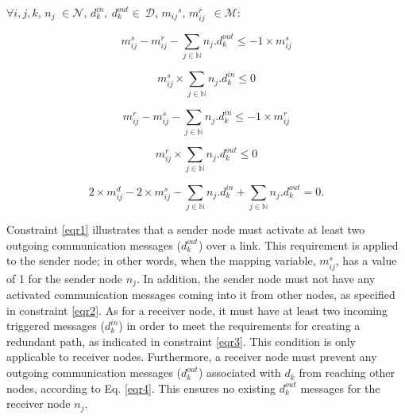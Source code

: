   
    
    
    $\forall i, j, k$, ${n_{j}}$  $\in \mathcal{N}$, $d_k^{in},~d_k^{out}\in~\mathcal{D}$, ${m_{ij}}^{s}$, $m_{ij}^{r}$~$\in\mathcal{M} $:\newline

	\begin{equation}
		 {m_{ij}^{s}} - m_{ij}^{r} -  \sum_{j \in \mathbb{N} } n_{j}.d_{k}^{out} \leq -1 \times {m_{ij}^{s}}
		\label{eqr1} 
	\end{equation}
	
	\begin{equation}%
		 {m_{ij}^{s}} \times \sum_{j \in \mathbb{N} } n_{j}.d_{k}^{in} \leq 0 
		\label{eqr2}
	\end{equation}
	
	\begin{equation}%
		{m_{ij}^{r}}  - m_{ij}^{s}  - \sum_{j \in \mathbb{N} } n_{j}.d_{k}^{in} \leq -1 \times {m_{ij}^{r}}
		\label{eqr3}
	\end{equation}

	\begin{equation}%
		 {m_{ij}^{r}} \times \sum_{j \in \mathbb{N} } n_{j}.d_{k}^{out} \leq 0 
		\label{eqr4}
	\end{equation}
	


    \begin{equation}
    	  2 \times {m_{ij}^{d}} - 2 \times m_{ij}^{s} - \sum_{j \in \mathbb{N} } n_{j}.d_k^{in} + \sum_{j \in \mathbb{N} } n_{j}.d_k^{out} = 0.
    	\label{eqr5}
    \end{equation}\newline
    
    
    
 
    Constraint \eqref{eqr1} illustrates that a sender node must activate at least two outgoing communication messages ($d_k^{out}$) over a link. This requirement is applied to the sender node; in other words, when the mapping variable, $m_{ij}^{s}$, has a value of 1 for the sender node $n_j$. In addition, the sender node must not have any activated communication messages coming into it from other nodes, as specified in constraint \eqref{eqr2}.
    As for a receiver node, it must have at least two incoming triggered messages ($d_k^{in}$) in order to meet the requirements for creating a redundant path, as indicated in constraint \eqref{eqr3}. This condition is only applicable to receiver nodes.
    Furthermore, a receiver node must prevent any outgoing communication messages ($d_k^{out}$) associated with $d_k$ from reaching other nodes, according to Eq. \eqref{eqr4}. This ensures no existing $d_k^{out}$ messages for the receiver node $n_j$.
     
